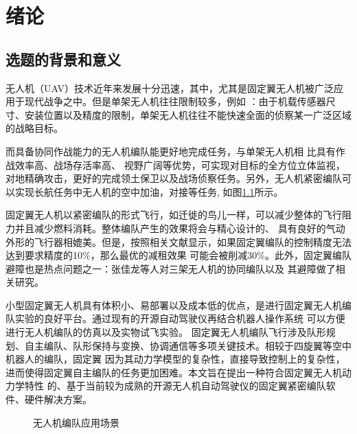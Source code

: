 %
%
%
%

\chapter{绪论}
\label{chap:intro}
\section{选题的背景和意义}
无人机（UAV）技术近年来发展十分迅速，其中，尤其是固定翼无人机被广泛应用于现代战争之中。但是单架无人机往往限制较多，例如
：由于机载传感器尺寸、安装位置以及精度的限制，单架无人机往往不能快速全面的侦察某一广泛区域的战略目标。

而具备协同作战能力的无人机编队能更好地完成任务，与单架无人机相 比具有作战效率高、战场存活率高、
视野广阔等优势，可实现对目标的全方位立体监视，对地精确攻击，更好的完成领土保卫以及战场侦察任务。另外，无人机紧密编队可
以实现长航任务中无人机的空中加油，对接等任务, 如图\ref{fig:c01-meaning}所示。

固定翼无人机以紧密编队的形式飞行，如迁徙的鸟儿一样，可以减少整体的飞行阻力并且减少燃料消耗。整体编队产生的效果将会与精心设计的、
具有良好的气动外形的飞行器相媲美。但是，按照相关文献显示，如果固定翼编队的控制精度无法达到要求精度的10\%，那么最优的减租效果
可能会被削减30\%。\cite{Zhang2017Aerodynamics}此外，固定翼编队避障也是热点问题之一：张佳龙等人对三架无人机的协同编队以及
其避障做了相关研究。\cite{Zzhangjialong2019Collision}

小型固定翼无人机具有体积小、易部署以及成本低的优点，是进行固定翼无人机编队实验的良好平台。\cite{Wangxiangke2019}通过现有的开源自动驾驶仪再结合机器人操作系统
可以方便进行无人机编队的仿真以及实物试飞实验。
固定翼无人机编队飞行涉及队形规划、自主编队、队形保持与变换、协调通信等多项关键技术。相较于四旋翼等空中机器人的编队，固定翼
因为其动力学模型的复杂性，直接导致控制上的复杂性，进而使得固定翼自主编队的任务更加困难。本文旨在提出一种符合固定翼无人机动力学特性
的、基于当前较为成熟的开源无人机自动驾驶仪的固定翼紧密编队软件、硬件解决方案。
 \begin{figure}[H]
  \centering
  \caption{无人机编队应用场景}
  \label{fig:c01-meaning}
  \end{figure}
